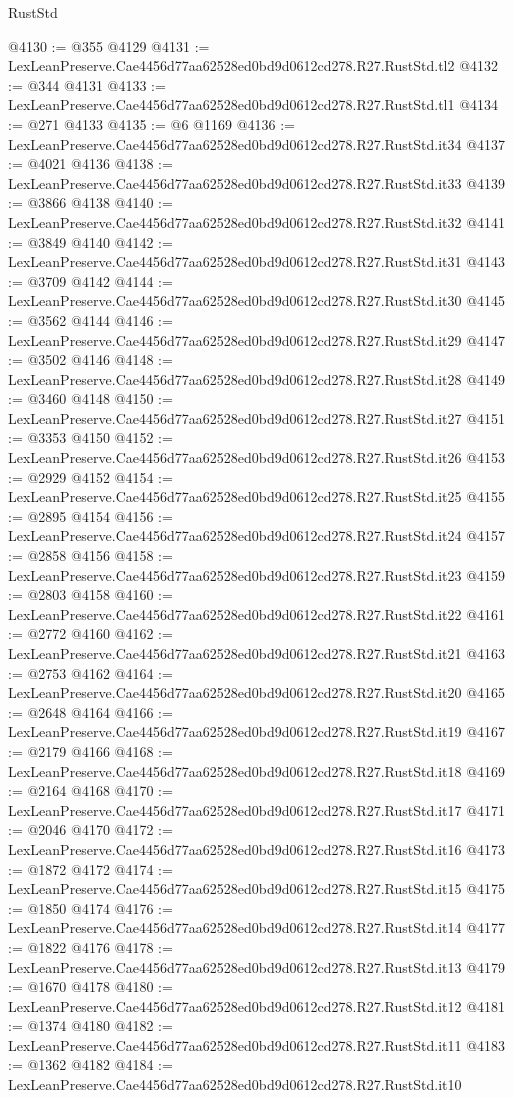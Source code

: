 \begin{lexlean}{RustStd}
\begin{coremodule}
@4130 := @355 @4129
@4131 := LexLeanPreserve.Cae4456d77aa62528ed0bd9d0612cd278.R27.RustStd.tl2
@4132 := @344 @4131
@4133 := LexLeanPreserve.Cae4456d77aa62528ed0bd9d0612cd278.R27.RustStd.tl1
@4134 := @271 @4133
@4135 := @6 @1169
@4136 := LexLeanPreserve.Cae4456d77aa62528ed0bd9d0612cd278.R27.RustStd.it34
@4137 := @4021 @4136
@4138 := LexLeanPreserve.Cae4456d77aa62528ed0bd9d0612cd278.R27.RustStd.it33
@4139 := @3866 @4138
@4140 := LexLeanPreserve.Cae4456d77aa62528ed0bd9d0612cd278.R27.RustStd.it32
@4141 := @3849 @4140
@4142 := LexLeanPreserve.Cae4456d77aa62528ed0bd9d0612cd278.R27.RustStd.it31
@4143 := @3709 @4142
@4144 := LexLeanPreserve.Cae4456d77aa62528ed0bd9d0612cd278.R27.RustStd.it30
@4145 := @3562 @4144
@4146 := LexLeanPreserve.Cae4456d77aa62528ed0bd9d0612cd278.R27.RustStd.it29
@4147 := @3502 @4146
@4148 := LexLeanPreserve.Cae4456d77aa62528ed0bd9d0612cd278.R27.RustStd.it28
@4149 := @3460 @4148
@4150 := LexLeanPreserve.Cae4456d77aa62528ed0bd9d0612cd278.R27.RustStd.it27
@4151 := @3353 @4150
@4152 := LexLeanPreserve.Cae4456d77aa62528ed0bd9d0612cd278.R27.RustStd.it26
@4153 := @2929 @4152
@4154 := LexLeanPreserve.Cae4456d77aa62528ed0bd9d0612cd278.R27.RustStd.it25
@4155 := @2895 @4154
@4156 := LexLeanPreserve.Cae4456d77aa62528ed0bd9d0612cd278.R27.RustStd.it24
@4157 := @2858 @4156
@4158 := LexLeanPreserve.Cae4456d77aa62528ed0bd9d0612cd278.R27.RustStd.it23
@4159 := @2803 @4158
@4160 := LexLeanPreserve.Cae4456d77aa62528ed0bd9d0612cd278.R27.RustStd.it22
@4161 := @2772 @4160
@4162 := LexLeanPreserve.Cae4456d77aa62528ed0bd9d0612cd278.R27.RustStd.it21
@4163 := @2753 @4162
@4164 := LexLeanPreserve.Cae4456d77aa62528ed0bd9d0612cd278.R27.RustStd.it20
@4165 := @2648 @4164
@4166 := LexLeanPreserve.Cae4456d77aa62528ed0bd9d0612cd278.R27.RustStd.it19
@4167 := @2179 @4166
@4168 := LexLeanPreserve.Cae4456d77aa62528ed0bd9d0612cd278.R27.RustStd.it18
@4169 := @2164 @4168
@4170 := LexLeanPreserve.Cae4456d77aa62528ed0bd9d0612cd278.R27.RustStd.it17
@4171 := @2046 @4170
@4172 := LexLeanPreserve.Cae4456d77aa62528ed0bd9d0612cd278.R27.RustStd.it16
@4173 := @1872 @4172
@4174 := LexLeanPreserve.Cae4456d77aa62528ed0bd9d0612cd278.R27.RustStd.it15
@4175 := @1850 @4174
@4176 := LexLeanPreserve.Cae4456d77aa62528ed0bd9d0612cd278.R27.RustStd.it14
@4177 := @1822 @4176
@4178 := LexLeanPreserve.Cae4456d77aa62528ed0bd9d0612cd278.R27.RustStd.it13
@4179 := @1670 @4178
@4180 := LexLeanPreserve.Cae4456d77aa62528ed0bd9d0612cd278.R27.RustStd.it12
@4181 := @1374 @4180
@4182 := LexLeanPreserve.Cae4456d77aa62528ed0bd9d0612cd278.R27.RustStd.it11
@4183 := @1362 @4182
@4184 := LexLeanPreserve.Cae4456d77aa62528ed0bd9d0612cd278.R27.RustStd.it10

\end{coremodule}
\end{lexlean}
